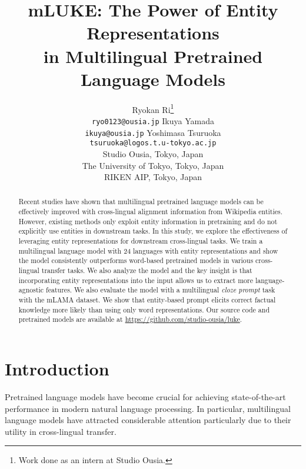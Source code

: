 \documentclass[11pt]{article}
\title{mLUKE: The Power of Entity Representations\\in Multilingual Pretrained Language Models}
\author{
Ryokan Ri\thanks{\hspace{2mm}Work done as an intern at Studio Ousia.}\\
    {\small \texttt{ryo0123@ousia.jp}}
    \And
    Ikuya Yamada\\
    {\small \texttt{ikuya@ousia.jp}}
    \And
    Yoshimasa Tsuruoka\\
    {\small \texttt{tsuruoka@logos.t.u-tokyo.ac.jp}}
    \AND
    \begin{minipage}{\textwidth}
        \begin{center}
            \fontsize{11.5}{14}\selectfont
            \textnormal{Studio Ousia, Tokyo, Japan \\ The University of Tokyo, Tokyo, Japan \\ RIKEN AIP, Tokyo, Japan}\\ \end{center}
    \end{minipage}
}
\begin{document}
\maketitle
\begin{abstract}
Recent studies have shown that multilingual pretrained language models can be effectively improved with cross-lingual alignment information from Wikipedia entities.
However, existing methods only exploit entity information in pretraining and do not explicitly use entities in downstream tasks.
In this study, we explore the effectiveness of leveraging entity representations for downstream cross-lingual tasks.
We train a multilingual language model with 24 languages with entity representations and show
the model consistently outperforms word-based pretrained models in various cross-lingual transfer tasks.
We also analyze the model and the key insight is that incorporating entity representations into the input allows us to extract more language-agnostic features.
We also evaluate the model with a multilingual {\it cloze prompt} task with the mLAMA dataset.
We show that entity-based prompt elicits correct factual knowledge more likely than using only word representations.
Our source code and pretrained models are available at \url{https://github.com/studio-ousia/luke}. \end{abstract}

\newcommand{\mask}{\texttt{[MASK]}}

\newcommand{\sentence}[1]{``{\it #1}''}
\newcommand{\word}[1]{{\it #1}}

\newcommand{\mluke}{mLUKE}
\newcommand{\mbert}{mBERT}
\newcommand{\xlmr}{XLM-R}
\newcommand{\extraTraining}{+ extra training}
\newcommand{\mlukeW}{mLUKE-W}
\newcommand{\mlukeE}{mLUKE-E}
\newcommand{\xlmk}{XLM-K}

\newcommand{\ba}{}
\newcommand{\la}{}

\newcommand{\X}{\texttt{[X]}}
\newcommand{\Y}{\texttt{[Y]}}
\newcommand{\mlukeEwithY}{\mlukeE{}\ba{} (\Y{})}
\newcommand{\mlukeEwithXY}{\mlukeE{}\ba{} (\X{} \& \Y{})}
 \section{Introduction}
Pretrained language models have become crucial for achieving state-of-the-art performance in modern natural language processing.
In particular, multilingual language models \citep{NEURIPS2019_c04c19c2,conneau-etal-2020-unsupervised,Doddapaneni2021APO} have attracted considerable attention particularly due to their utility in cross-lingual transfer.
\end{document}
